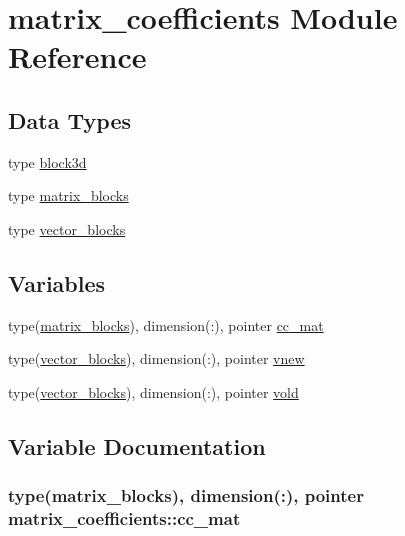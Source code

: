 \hypertarget{namespacematrix__coefficients}{}\section{matrix\+\_\+coefficients Module Reference}
\label{namespacematrix__coefficients}
\subsection*{Data Types}
\begin{DoxyCompactItemize}
\item 
type \hyperlink{structmatrix__coefficients_1_1block3d}{block3d}
\item 
type \hyperlink{structmatrix__coefficients_1_1matrix__blocks}{matrix\+\_\+blocks}
\item 
type \hyperlink{structmatrix__coefficients_1_1vector__blocks}{vector\+\_\+blocks}
\end{DoxyCompactItemize}
\subsection*{Variables}
\begin{DoxyCompactItemize}
\item 
type(\hyperlink{structmatrix__coefficients_1_1matrix__blocks}{matrix\+\_\+blocks}), dimension(\+:), pointer \hyperlink{namespacematrix__coefficients_ad3dcb132e912fb77f0bd9ee1cc3f5b83}{cc\+\_\+mat}
\item 
type(\hyperlink{structmatrix__coefficients_1_1vector__blocks}{vector\+\_\+blocks}), dimension(\+:), pointer \hyperlink{namespacematrix__coefficients_acd6ee2b27ca034993909f2165ded3bf8}{vnew}
\item 
type(\hyperlink{structmatrix__coefficients_1_1vector__blocks}{vector\+\_\+blocks}), dimension(\+:), pointer \hyperlink{namespacematrix__coefficients_aa26a51af7d3b74002acec25325ea0fde}{vold}
\end{DoxyCompactItemize}


\subsection{Variable Documentation}
\subsubsection[{\texorpdfstring{cc\+\_\+mat}{cc_mat}}]{\setlength{\rightskip}{0pt plus 5cm}type({\bf matrix\+\_\+blocks}), dimension(\+:), pointer matrix\+\_\+coefficients\+::cc\+\_\+mat}\hypertarget{namespacematrix__coefficients_ad3dcb132e912fb77f0bd9ee1cc3f5b83}{}\label{namespacematrix__coefficients_ad3dcb132e912fb77f0bd9ee1cc3f5b83}
